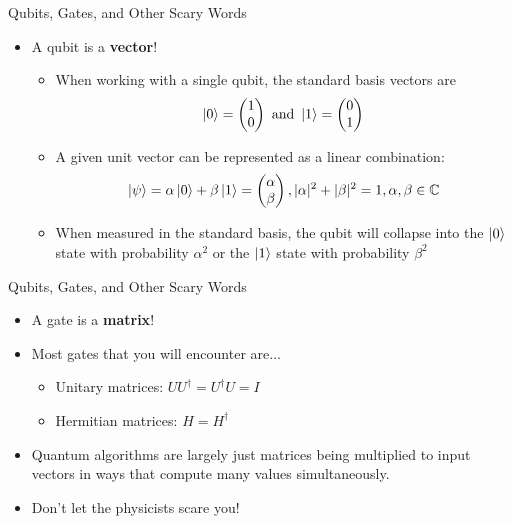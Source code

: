 \documentclass[aspectratio=169, handout]{beamer}
\begin{document}
\begin{frame}{Qubits, Gates, and Other Scary Words}
    \begin{itemize}
        \item A qubit is a \textbf{vector}! \pause
        \begin{itemize}
            \item When working with a single qubit, the standard basis vectors are
            \begin{equation*}
                \ket{0} = \begin{pmatrix}
                1 \\
                0
                \end{pmatrix}
                \text{ and }
                \ket{1} = \begin{pmatrix}
                0 \\
                1
                \end{pmatrix}
            \end{equation*} \pause
            \item A given unit vector can be represented as a linear combination:
            \begin{equation*}
                \ket{\psi} = \alpha \ket{0} + \beta \ket{1} = \begin{pmatrix}
                \alpha \\
                \beta
                \end{pmatrix},
                |\alpha|^2 + |\beta|^2 = 1, \alpha, \beta \in \mathbb{C}
            \end{equation*}
            \pause
            \item When measured in the standard basis, the qubit will collapse into the $\ket{0}$ state with probability $\alpha^2$ or the $\ket{1}$ state with probability $\beta^2$
        \end{itemize}
    \end{itemize}
\end{frame}

\begin{frame}{Qubits, Gates, and Other Scary Words}
\begin{itemize}
    \item A gate is a \textbf{matrix}! \pause
    \item Most gates that you will encounter are... \pause
    \begin{itemize}
        \item Unitary matrices: $UU^\dag = U^\dag U = I$
        \item Hermitian matrices: $H = H^\dag$
    \end{itemize} \pause
    \item Quantum algorithms are largely just matrices being multiplied to input vectors in ways that compute many values simultaneously. \pause
    \item Don't let the physicists scare you!
\end{itemize}
\end{frame}
        
\end{document}
